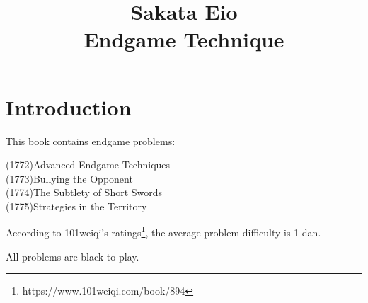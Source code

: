 
\def\problems{%
\p{1772/14890}%
\p{1772/18981}%
\p{1772/36601}%
\p{1772/51964}%
\p{1772/51965}%
\p{1772/51966}%
\p{1772/51967}%
\p{1772/51968}%
\p{1772/51969}%
\p{1772/51970}%
\p{1772/51971}%
\p{1772/51972}%
\p{1772/51973}%
\p{1772/51974}%
\p{1772/51975}%
\p{1772/51976}%
\p{1772/51977}%
\p{1772/51979}%
\p{1772/51980}%
\p{1772/51981}%
\p{1772/51982}%
\p{1772/51983}%
\p{1772/51984}%
\p{1772/51985}%
\p{1773/275}%
\p{1773/36737}%
\p{1773/40977}%
\p{1773/51987}%
\p{1773/51988}%
\p{1773/51989}%
\p{1773/51990}%
\p{1773/51991}%
\p{1773/51992}%
\p{1773/51993}%
\p{1773/51994}%
\p{1773/51995}%
\p{1773/51996}%
\p{1773/51997}%
\p{1773/51998}%
\p{1773/51999}%
\p{1773/52000}%
\p{1773/52001}%
\p{1773/52002}%
\p{1773/52003}%
\p{1773/52004}%
\p{1773/52005}%
\p{1773/52006}%
\p{1773/52007}%
\p{1774/52008}%
\p{1774/52009}%
\p{1774/52010}%
\p{1774/52011}%
\p{1774/52012}%
\p{1774/52013}%
\p{1774/52014}%
\p{1774/52015}%
\p{1774/52016}%
\p{1774/52017}%
\p{1774/52018}%
\p{1774/52019}%
\p{1774/52020}%
\p{1774/52021}%
\p{1774/52022}%
\p{1774/52023}%
\p{1774/52024}%
\p{1774/52025}%
\p{1774/52026}%
\p{1774/52027}%
\p{1774/52028}%
\p{1774/52029}%
\p{1774/52030}%
\p{1774/52031}%
\p{1775/7706}%
\p{1775/32053}%
\p{1775/51200}%
\p{1775/52032}%
\p{1775/52033}%
\p{1775/52034}%
\p{1775/52035}%
\p{1775/52036}%
\p{1775/52037}%
\p{1775/52038}%
\p{1775/52039}%
\p{1775/52040}%
\p{1775/52041}%
\p{1775/52042}%
\p{1775/52043}%
\p{1775/52044}%
\p{1775/52045}%
\p{1775/52046}%
\p{1775/52047}%
\p{1775/52048}%
\p{1775/52049}%
\p{1775/52050}%
\p{1775/52051}%
\p{1775/52052}%
}



\title{Sakata Eio\\Endgame Technique}

\chapter*{Introduction}%
\thispagestyle{empty}%
This book contains \countproblems{} endgame problems:

(1772)\:\:Advanced Endgame Techniques\\
(1773)\:\:Bullying the Opponent\\
(1774)\:\:The Subtlety of Short Swords\\
(1775)\:\:Strategies in the Territory

According to 101weiqi's ratings\footnote{https://www.101weiqi.com/book/894}, the average problem difficulty is 1 dan.

All problems are black to play.

\renderproblems
\rendersolutions



